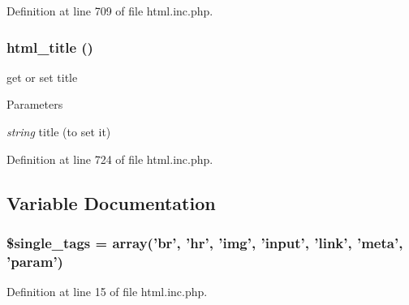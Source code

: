 Definition at line 709 of file html.inc.php.

\hypertarget{html_8inc_8php_a3f572f51a815fe19c590fea7d6d3a1a6}{
\subsubsection[{html\_\-title}]{\setlength{\rightskip}{0pt plus 5cm}html\_\-title ()}}
\label{html_8inc_8php_a3f572f51a815fe19c590fea7d6d3a1a6}
get or set title


\begin{DoxyParams}{Parameters}
\item[{\em string}]title (to set it) \end{DoxyParams}


Definition at line 724 of file html.inc.php.



\subsection{Variable Documentation}
\hypertarget{html_8inc_8php_a0a733c7a281726a879f13e7325881887}{
\subsubsection[{\$single\_\-tags}]{\setlength{\rightskip}{0pt plus 5cm}\$single\_\-tags = array('br', 'hr', 'img', 'input', 'link', 'meta', 'param')}}
\label{html_8inc_8php_a0a733c7a281726a879f13e7325881887}


Definition at line 15 of file html.inc.php.


